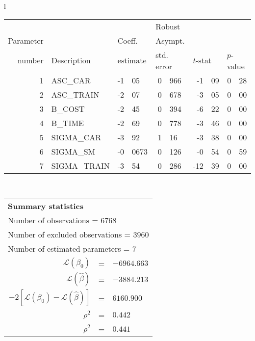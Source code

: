   \begin{tabular}{l}
\begin{tabular}{rlr@{.}lr@{.}lr@{.}lr@{.}l}
         &                       &   \multicolumn{2}{l}{}    & \multicolumn{2}{l}{Robust}  &     \multicolumn{4}{l}{}   \\
Parameter &                       &   \multicolumn{2}{l}{Coeff.}      & \multicolumn{2}{l}{Asympt.}  &     \multicolumn{4}{l}{}   \\
number &  Description                     &   \multicolumn{2}{l}{estimate}      & \multicolumn{2}{l}{std. error}  &   \multicolumn{2}{l}{$t$-stat}  &   \multicolumn{2}{l}{$p$-value}   \\

\hline

1 & ASC_CAR & -1&05 & 0&966 & -1&09 & 0&28\\
2 & ASC_TRAIN & -2&07 & 0&678 & -3&05 & 0&00\\
3 & B_COST & -2&45 & 0&394 & -6&22 & 0&00\\
4 & B_TIME & -2&69 & 0&778 & -3&46 & 0&00\\
5 & SIGMA_CAR & -3&92 & 1&16 & -3&38 & 0&00\\
6 & SIGMA_SM & -0&0673 & 0&126 & -0&54 & 0&59\\
7 & SIGMA_TRAIN & -3&54 & 0&286 & -12&39 & 0&00\\
\hline
\end{tabular}
\\
\begin{tabular}{rcl}
\multicolumn{3}{l}{\bf Summary statistics}\\
\multicolumn{3}{l}{ Number of observations = $6768$} \\
\multicolumn{3}{l}{ Number of excluded observations = $3960$} \\
\multicolumn{3}{l}{ Number of estimated  parameters = $7$} \\
 $\mathcal{L}(\beta_0)$ &=&  $-6964.663$ \\
 $\mathcal{L}(\hat{\beta})$ &=& $-3884.213 $  \\
 $-2[\mathcal{L}(\beta_0) -\mathcal{L}(\hat{\beta})]$ &=& $6160.900$ \\
    $\rho^2$ &=&   $0.442$ \\
    $\bar{\rho}^2$ &=&    $0.441$ \\
\end{tabular}
  \end{tabular}
